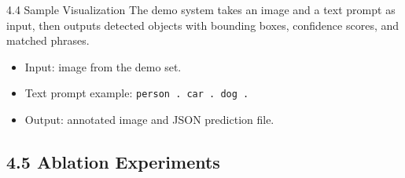 \documentclass[aspectratio=169,10pt]{beamer}
\begin{document}
\begin{frame}{4.4 Sample Visualization}
\small
The demo system takes an image and a text prompt as input, then outputs detected objects with bounding boxes, confidence scores, and matched phrases.

\vspace{0.8em}

\begin{itemize}
    \item Input: image from the demo set.
    \item Text prompt example: \texttt{person . car . dog .}
    \item Output: annotated image and JSON prediction file.
\end{itemize}

\vspace{1em}


\end{frame}

\subsection{4.5 Ablation Experiments}
\end{document}
